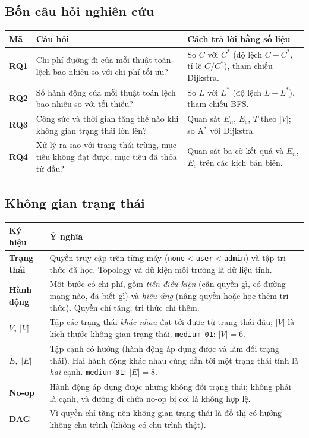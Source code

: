 \documentclass[11pt,a4paper]{article}
\newcommand{\Cs}{C^{*}}
\newcommand{\Ls}{L^{*}}
\newcommand{\V}{|V|}
\newcommand{\E}{|E|}
\newcommand{\En}{E_{n}}
\begin{document}
\subsection{Bốn câu hỏi nghiên cứu}

\begin{longtable}{@{}Y{1.6cm}Y{6.2cm}Y{7.4cm}@{}}
\toprule
Mã & Câu hỏi & Cách trả lời bằng số liệu \\
\midrule
\endhead
\textbf{RQ1} & Chi phí đường đi của mỗi thuật toán lệch bao nhiêu so với chi phí tối ưu? & So $C$ với $\Cs$ (độ lệch $C-\Cs$, tỉ lệ $C/\Cs$), tham chiếu Dijkstra. \\
\textbf{RQ2} & Số hành động của mỗi thuật toán lệch bao nhiêu so với tối thiểu? & So $L$ với $\Ls$ (độ lệch $L-\Ls$), tham chiếu BFS. \\
\textbf{RQ3} & Công sức và thời gian tăng thế nào khi không gian trạng thái lớn lên? & Quan sát $\En$, $E_e$, $T$ theo $\V$; so A$^{*}$ với Dijkstra. \\
\textbf{RQ4} & Xử lý ra sao với trạng thái trùng, mục tiêu không đạt được, mục tiêu đã thỏa từ đầu? & Quan sát ba cờ kết quả và $\En$, $E_e$ trên các kịch bản biên. \\
\bottomrule
\end{longtable}

\subsection{Không gian trạng thái}

\begin{longtable}{@{}Y{2.6cm}Y{13.2cm}@{}}
\toprule
Ký hiệu & Ý nghĩa \\
\midrule
\endhead
\textbf{Trạng thái} & Quyền truy cập trên từng máy (\texttt{none}$<$\texttt{user}$<$\texttt{admin}) và tập tri thức đã học. Topology và dữ kiện môi trường là dữ liệu tĩnh. \\
\textbf{Hành động} & Một bước có chi phí, gồm \emph{tiền điều kiện} (cần quyền gì, có đường mạng nào, đã biết gì) và \emph{hiệu ứng} (nâng quyền hoặc học thêm tri thức). Quyền chỉ tăng, tri thức chỉ thêm. \\
\textbf{$V$, $\V$} & Tập các trạng thái \emph{khác nhau} đạt tới được từ trạng thái đầu; $\V$ là kích thước không gian trạng thái. \texttt{medium-01}: $\V=6$. \\
\textbf{$E$, $\E$} & Tập cạnh có hướng (hành động áp dụng được và làm đổi trạng thái). Hai hành động khác nhau cùng dẫn tới một trạng thái tính là \emph{hai} cạnh. \texttt{medium-01}: $\E=8$. \\
\textbf{No-op} & Hành động áp dụng được nhưng không đổi trạng thái; không phải là cạnh, và đường đi chứa no-op bị coi là không hợp lệ. \\
\textbf{DAG} & Vì quyền chỉ tăng nên không gian trạng thái là đồ thị có hướng không chu trình (không có chu trình thật). \\
\bottomrule
\end{longtable}
\end{document}
